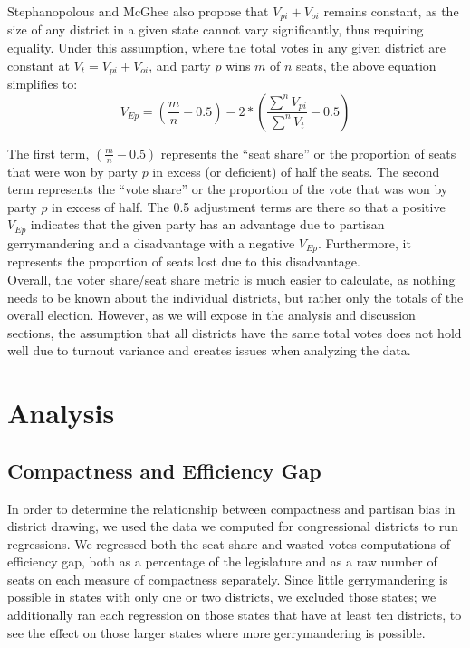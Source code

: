 \documentclass[12pt]{article}
\begin{document}
     Stephanopolous and McGhee also propose that $V_{pi}+V_{oi}$ remains constant, as the size of any district in a given state cannot vary significantly, thus requiring equality.  Under this assumption, where the total votes in any given district are constant at $V_{t} = V_{pi}+V_{oi}$, and party $p$ wins $m$ of $n$ seats, the above equation simplifies to:
     \[V_{Ep} = (\frac{m}{n}-0.5) - 2*(\frac{\sum^{n}V_{pi}}{\sum^n{V_t}}-0.5)\]
  
  The first term, $(\frac{m}{n}-0.5)$ represents the ``seat share'' or the proportion of seats that were won by party $p$ in excess (or deficient) of half the seats.  The second term represents the ``vote share'' or the proportion of the vote that was won by party $p$ in excess of half. The 0.5 adjustment terms are there so that a positive $V_{Ep}$ indicates that the given party has an advantage due to partisan gerrymandering and a disadvantage with a negative $V_{Ep}$.  Furthermore, it represents the proportion of seats lost due to this disadvantage.\\
  
  Overall, the voter share/seat share metric is much easier to calculate, as nothing needs to be known about the individual districts, but rather only the totals of the overall election.  However, as we will expose in the analysis and discussion sections, the assumption that all districts have the same total votes does not hold well due to turnout variance and creates issues when analyzing the data.\\
  

  \section{Analysis}

  \subsection{Compactness and Efficiency Gap}
  
  In order to determine the relationship between compactness and partisan bias in district drawing, we used the data we computed for congressional districts to run regressions.  We regressed both the seat share and wasted votes computations of efficiency gap, both as a percentage of the legislature and as a raw number of seats on each measure of compactness separately.  Since little gerrymandering is possible in states with only one or two districts, we excluded those states; we additionally ran each regression on those states that have at least ten districts, to see the effect on those larger states where more gerrymandering is possible.
\end{document}
